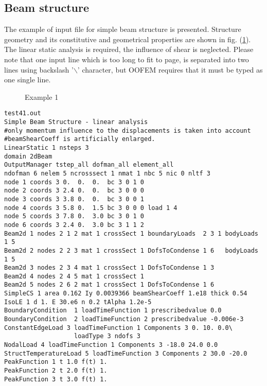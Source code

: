 \documentclass[draft]{article}
\begin{document}
\subsection {Beam structure}
The example of input file for simple beam structure is presented.
Structure geometry and its constitutive and geometrical properties are
shown in fig. (\ref{ex01}). The linear static analysis is required,
the influence of shear is neglected. Please note that one input line
which is too long to fit to page, is separated into two lines using
backslash '$\backslash$' character, but OOFEM requires that it must be typed as one single line.
\begin{figure}[tb]
\caption{Example 1}
\label{ex01}

\end{figure}
{\small\begin{verbatim}
test41.out
Simple Beam Structure - linear analysis
#only momentum influence to the displacements is taken into account
#beamShearCoeff is artificially enlarged.
LinearStatic 1 nsteps 3
domain 2dBeam
OutputManager tstep_all dofman_all element_all
ndofman 6 nelem 5 ncrosssect 1 nmat 1 nbc 5 nic 0 nltf 3
node 1 coords 3 0.  0.  0.  bc 3 0 1 0
node 2 coords 3 2.4 0.  0.  bc 3 0 0 0
node 3 coords 3 3.8 0.  0.  bc 3 0 0 1
node 4 coords 3 5.8 0.  1.5 bc 3 0 0 0 load 1 4
node 5 coords 3 7.8 0.  3.0 bc 3 0 1 0
node 6 coords 3 2.4 0.  3.0 bc 3 1 1 2
Beam2d 1 nodes 2 1 2 mat 1 crossSect 1 boundaryLoads  2 3 1 bodyLoads 1 5
Beam2d 2 nodes 2 2 3 mat 1 crossSect 1 DofsToCondense 1 6   bodyLoads 1 5
Beam2d 3 nodes 2 3 4 mat 1 crossSect 1 DofsToCondense 1 3 
Beam2d 4 nodes 2 4 5 mat 1 crossSect 1 
Beam2d 5 nodes 2 6 2 mat 1 crossSect 1 DofsToCondense 1 6 
SimpleCS 1 area 0.162 Iy 0.0039366 beamShearCoeff 1.e18 thick 0.54 
IsoLE 1 d 1. E 30.e6 n 0.2 tAlpha 1.2e-5
BoundaryCondition  1 loadTimeFunction 1 prescribedvalue 0.0 	
BoundaryCondition  2 loadTimeFunction 2 prescribedvalue -0.006e-3 	
ConstantEdgeLoad 3 loadTimeFunction 1 Components 3 0. 10. 0.0\
                   loadType 3 ndofs 3
NodalLoad 4 loadTimeFunction 1 Components 3 -18.0 24.0 0.0
StructTemperatureLoad 5 loadTimeFunction 3 Components 2 30.0 -20.0
PeakFunction 1 t 1.0 f(t) 1.
PeakFunction 2 t 2.0 f(t) 1.
PeakFunction 3 t 3.0 f(t) 1.
\end{verbatim}}
\end{document}
